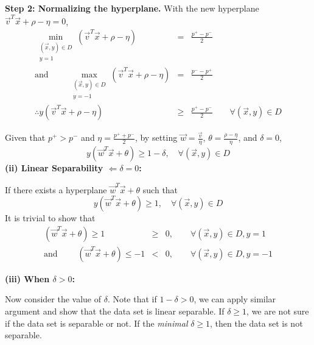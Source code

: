 \begin{enumerate}
{      { \bf Step 2: Normalizing the hyperplane.} 
      With the new hyperplane \\ 
      $\vec{v}^T
      \vec{x} + \rho - \eta = 0$,
      \begin{eqnarray*}
        \min_{\substack{(\vec{x},y)\in D \\ y=1}} (\vec{v}^T \vec{x} + \rho - \eta) & = & \frac{p^{+}-p^{-}}{2} \\
      \textrm{and } \qquad 
        \max_{\substack{(\vec{x},y)\in D \\ y=-1}} (\vec{v}^T \vec{x} + \rho - \eta) & = & \frac{p^{-}-p^{+}}{2} \\
        \therefore y(\vec{v}^T \vec{x} + \rho - \eta) & \geq & \frac{p^{+}-p^{-}}{2} \qquad \forall (\vec{x},y) \in D
      \end{eqnarray*}

      Given that $p^{+}>p^{-}$ and $\eta = \frac{p^{+}+p^{-}}{2}$, by setting $\vec{w} =
      \frac{\vec{v}}{\eta}$, $\theta = \frac{\rho - \eta}{\eta}$, and $\delta=0$,
      \begin{equation*}
        y(\vec{w}^T \vec{x} + \theta) \geq 1 - \delta, \quad \forall (\vec{x},y) \in D
      \end{equation*}
      \noindent \textbf{(ii) Linear Separability $\Leftarrow \delta = 0$:}

      If there exists a hyperplane $\vec{w}^T \vec{x} + \theta$ such that
      \begin{equation*}
        y(\vec{w}^T \vec{x} + \theta) \geq 1, \quad \forall (\vec{x},y) \in D
      \end{equation*}
      It is trivial to show that
      \begin{eqnarray*}
        (\vec{w}^T \vec{x} + \theta) \geq 1 & \geq &  0, \qquad \forall (\vec{x},y)\in D, y=1 \\
      \textrm{and } \qquad (\vec{w}^T \vec{x} + \theta) \leq -1 & < &  0, \qquad \forall (\vec{x},y)\in D, y=-1
      \end{eqnarray*}

	\noindent \textbf{(iii) When $\delta>0$:}

      Now consider the value of $\delta$. Note that if $1-\delta > 0$, we can apply similar argument and show that the data set is linear separable. If $\delta \geq 1$, we are not sure if the data set is separable or not. If the {\em minimal} $\delta \geq 1$, then the data set is not separable.


}


\end{enumerate}
